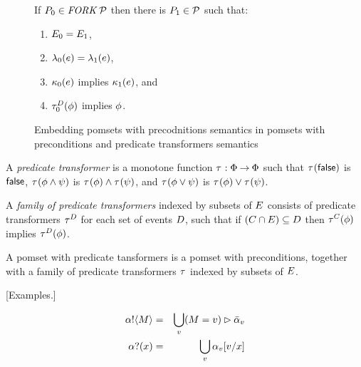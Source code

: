 \begin{figure*}
  If $\aPS_0 \in \wFORK\aPSS$ then there is $\aPS_1\in\aPSS$ such that:
  \begin{enumerate}
  \item $\aEvs_0=\aEvs_1$,
  \item $\labelingAct_0(\aEv) = \labelingAct_1(\aEv)$,
  \item $\labelingForm_0(\aEv)$ implies $\labelingForm_1(\aEv)$, and
  \item $\aTr[\bEvs]_0(\aForm)$ implies $\aForm$.
  \end{enumerate}
\caption{Embedding pomsets with precodnitions semantics in pomsets with preconditions and predicate transformers semantics}
\end{figure*}

\begin{definition}
  A \emph{predicate transformer} is a monotone function
  $\aTr:\Formulae\fun\Formulae$ such that
  $\aTr(\FALSE)$ is $\FALSE$,
  $\aTr(\aForm\land\bForm)$ is $\aTr(\aForm)\land\aTr(\bForm)$, and
  $\aTr(\aForm\lor\bForm)$ is $\aTr(\aForm)\lor\aTr(\bForm)$.
\end{definition}

\begin{definition}
  A \emph{family of predicate transformers}
  indexed by subsets of $\aEvs$
  consists of predicate transformers
  $\aTr[\bEvs]$ for each set of events $\bEvs$,
  such that if $(\cEvs\cap\aEvs) \subseteq \bEvs$
  then $\aTr[\cEvs](\aForm)$ implies $\aTr[\bEvs](\aForm)$.
\end{definition}

\begin{definition}
  A pomset with predicate tansformers is a
  pomset with preconditions, together with a family of predicate transformers $\aTr$
  indexed by subsets of $\aEvs$.
\end{definition}

[Examples.]

\begin{eqnarray*}
  \sSEND\aChan\aExp & = &
  \bigcup_\aVal (\aExp=\aVal) \sGUARD \send\aChan{\aVal}
\\
  \sRECV\aChan\aVar & = &
  \bigcup_\aVal \recv\aChan{\aVal}[\aVal/\aVar]
\end{eqnarray*}


